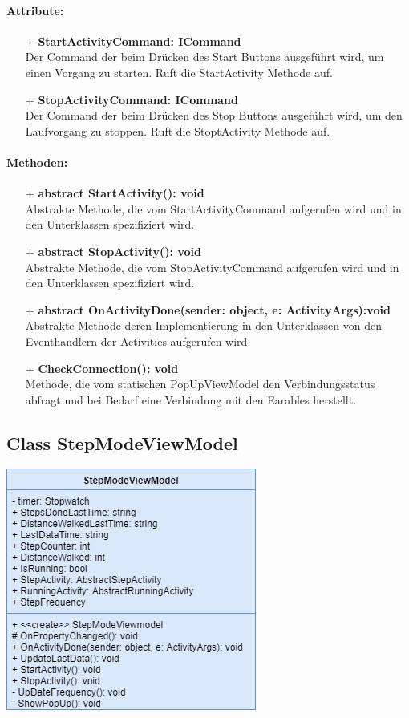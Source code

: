 \documentclass[a4paper,12pt]{article}
\begin{document}
\paragraph{Attribute:}
\begin{itemize}
	\item[+] \textbf{StartActivityCommand: ICommand} \\  Der Command der beim Drücken des Start Buttons ausgeführt wird, um einen Vorgang zu starten. Ruft die StartActivity Methode auf.
	\item[+] \textbf{StopActivityCommand: ICommand} \\ Der Command der beim Drücken des Stop Buttons ausgeführt wird, um den Laufvorgang zu stoppen. Ruft die StoptActivity Methode auf.
\end{itemize} 
\paragraph{Methoden:}
\begin{itemize}
	\item[+] \textbf{abstract StartActivity(): void} \\ Abstrakte Methode, die vom StartActivityCommand aufgerufen wird und in den Unterklassen spezifiziert wird.
	\item[+] \textbf{abstract StopActivity(): void} \\ Abstrakte Methode, die vom StopActivityCommand aufgerufen wird und in den Unterklassen spezifiziert wird.
	\item[+] \textbf{abstract OnActivityDone(sender: object, e: ActivityArgs):void} \\ Abstrakte Methode deren Implementierung in den Unterklassen von den Eventhandlern der Activities aufgerufen wird.
	\item[+] \textbf{CheckConnection(): void} \\ Methode, die vom statischen PopUpViewModel den Verbindungsstatus abfragt und bei Bedarf eine Verbindung mit den \Gls{Earables} herstellt.
\end{itemize}


	\subsection{Class StepModeViewModel}

	\includegraphics{bilder/ViewModelKlassen/StepModeViewModel.png}
\end{document}
